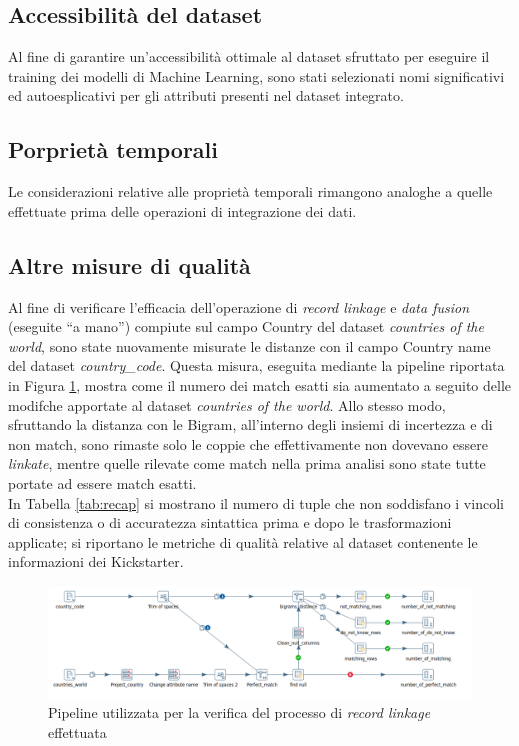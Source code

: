 \subsection{Accessibilità del dataset}
Al fine di garantire un'accessibilità ottimale al dataset sfruttato per eseguire il training dei modelli di Machine Learning, sono stati selezionati nomi significativi ed autoesplicativi per gli attributi presenti nel dataset integrato.

\subsection{Porprietà temporali}
Le considerazioni relative alle proprietà temporali rimangono analoghe a quelle effettuate prima delle operazioni di integrazione dei dati.

\subsection{Altre misure di qualità}
Al fine di verificare l'efficacia dell'operazione di \textit{record linkage} e \textit{data fusion} (eseguite “a mano”) compiute sul campo Country del dataset \textit{countries of the world}, sono state nuovamente misurate le distanze con il campo Country name del dataset \textit{country\_code}. Questa misura, eseguita mediante la pipeline riportata in Figura \ref{fig:qdtrecordlinkage}, mostra come il numero dei match esatti sia aumentato a seguito delle modifche apportate al dataset \textit{countries of the world}. Allo stesso modo, sfruttando la distanza con le Bigram, all'interno degli insiemi di incertezza e di non match, sono rimaste solo le coppie che effettivamente non dovevano essere \textit{linkate}, mentre quelle rilevate come match nella prima analisi sono state tutte portate ad essere match esatti.\\
In Tabella \ref{tab:recap} si mostrano il numero di tuple che non soddisfano i vincoli di consistenza o di accuratezza sintattica prima e dopo le trasformazioni applicate; si riportano le metriche di qualità relative al dataset contenente le informazioni dei Kickstarter.
\begin{figure}[h!]
	\centering
	\includegraphics[width=1\linewidth]{images/QDT_recordlinkage}
	\caption{Pipeline utilizzata per la verifica del processo di \textit{record linkage} effettuata}
	\label{fig:qdtrecordlinkage}
\end{figure}
